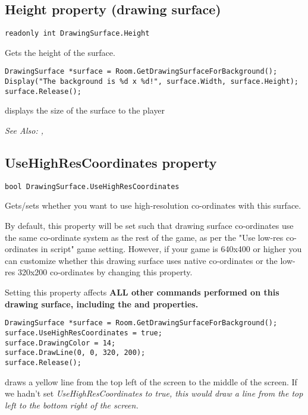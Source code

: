 \subsection{Height property (drawing surface)}\label{DrawingSurface.Height}%

\begin{verbatim}
readonly int DrawingSurface.Height
\end{verbatim}
Gets the height of the surface.

\begin{verbatim}
DrawingSurface *surface = Room.GetDrawingSurfaceForBackground();
Display("The background is %d x %d!", surface.Width, surface.Height);
surface.Release();
\end{verbatim}
displays the size of the surface to the player

\it{See Also:} ,


\subsection{UseHighResCoordinates property}\label{DrawingSurface.UseHighResCoordinates}%

\begin{verbatim}
bool DrawingSurface.UseHighResCoordinates
\end{verbatim}
Gets/sets whether you want to use high-resolution co-ordinates with this surface.

By default, this property will be set such that drawing surface co-ordinates use the same
co-ordinate system as the rest of the game, as per the "Use low-res co-ordinates in script"
game setting. However, if your game is 640x400 or higher you can customize whether
this drawing surface uses native co-ordinates or the low-res 320x200 co-ordinates by
changing this property.

Setting this property affects \bf{ALL} other commands performed on this drawing
surface, including the  and 
properties.

\begin{verbatim}
DrawingSurface *surface = Room.GetDrawingSurfaceForBackground();
surface.UseHighResCoordinates = true;
surface.DrawingColor = 14;
surface.DrawLine(0, 0, 320, 200);
surface.Release();
\end{verbatim}
draws a yellow line from the top left of the screen to the middle of the screen. If we
hadn't set \it{UseHighResCoordinates} to true, this would draw a line from the top left
to the bottom right of the screen.

